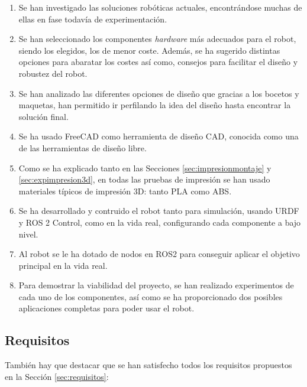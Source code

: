\begin{enumerate}
	\item Se han investigado las soluciones robóticas actuales, encontrándose muchas de ellas en fase todavía de experimentación.
	\item Se han seleccionado los componentes \textit{hardware} más adecuados para el robot, siendo  los elegidos, los de menor coste. Además, se ha sugerido distintas opciones para abaratar los costes así como, consejos para facilitar el diseño y robustez del robot. 
	\item Se han analizado las diferentes opciones de diseño que gracias a los bocetos y maquetas, han permitido ir perfilando la idea del diseño hasta encontrar la solución final.
	\item Se ha usado FreeCAD como herramienta de diseño \acs{CAD}, conocida como una de las herramientas de diseño libre. 
	\item Como se ha explicado tanto en las Secciones \ref{sec:impresionmontaje} y \ref{sec:expimpresion3d}, en todas las pruebas de impresión se han usado materiales típicos de impresión 3D: tanto PLA como ABS.
	\item Se ha desarrollado  y contruido el robot tanto para simulación, usando URDF y ROS 2 Control, como en la vida real, configurando cada componente a bajo nivel.
	\item Al robot se le ha dotado de nodos en ROS2 para conseguir aplicar el objetivo principal en la vida real.
	\item Para demostrar la viabilidad del proyecto, se han realizado experimentos de cada uno de los componentes, así como se ha proporcionado dos posibles aplicaciones completas para poder usar el robot.  
\end{enumerate}

\subsection{Requisitos}

También hay que destacar que se han satisfecho todos los requisitos propuestos en la Sección \ref{sec:requisitos}:

